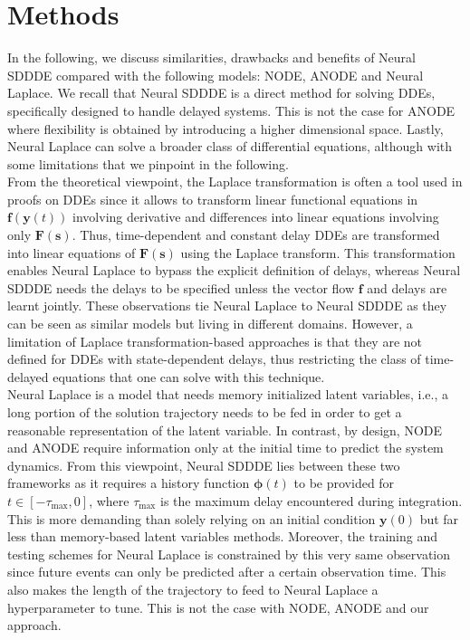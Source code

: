 \documentclass[pmlr]{jmlr}%
\newcommand{\LMcomment}[1]{{\bfseries \color{orange} [LM: #1]}}
\begin{document}
\section{Methods}\label{sec:methods}

In the following, we discuss similarities, drawbacks and benefits of Neural SDDDE compared with the following models: NODE, ANODE and Neural Laplace. We recall that Neural SDDDE is a direct method for solving DDEs, specifically designed to handle delayed systems. This is not the case for ANODE where flexibility is obtained by introducing a higher dimensional space. Lastly, Neural Laplace can solve a broader class of differential equations, although with some limitations that we pinpoint in the following.
\\

From the theoretical viewpoint, the Laplace transformation is often a tool used in proofs on DDEs \citep{Cook_book_ref_dde} since it allows to transform linear functional equations in $\mathbf{f}(\mathbf{y}(t))$ involving derivative and differences into linear equations involving only $\mathbf{F}(\mathbf{s})$. Thus, time-dependent and constant delay DDEs are transformed into linear equations of $\mathbf{F}(\mathbf{s})$ using the Laplace transform. This transformation enables Neural Laplace to bypass the explicit definition of delays, whereas Neural SDDDE needs the delays to be specified unless the vector flow $\mathbf{f}$ and delays are learnt jointly. These observations tie Neural Laplace to Neural SDDDE as they can be seen as similar models but living in different domains. However, a limitation of Laplace transformation-based approaches is that they are not defined for DDEs with state-dependent delays, thus restricting the class of time-delayed equations that one can solve with this technique. 
\\

Neural Laplace is a model that needs memory initialized latent variables, i.e., a long portion of the solution trajectory needs to be fed in order to get a reasonable representation of the latent variable. In contrast, by design, NODE and ANODE require information only at the initial time to predict the system dynamics. From this viewpoint, Neural SDDDE lies between these two frameworks as it requires a history function $\boldsymbol{\phi}(t)$ to be provided for $t\in[-\tau_{\mathrm{max}},0]$, where $\tau_{\mathrm{max}}$ is the maximum delay encountered during integration. This is more demanding than solely relying on an initial condition $\mathbf{y}(0)$ but far less than memory-based latent variables methods. Moreover, the training and testing schemes for Neural Laplace is constrained by this very same observation since future events can only be predicted after a certain observation time. This also makes the length of the trajectory to feed to Neural Laplace a hyperparameter to tune. This is not the case with NODE, ANODE and our approach. 
\end{document}
